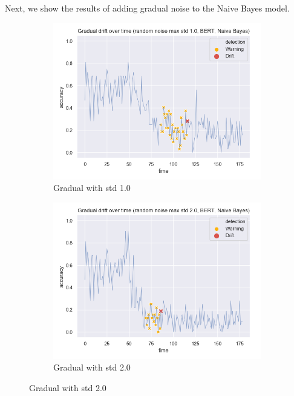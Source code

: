 \documentclass[12pt]{report}
\begin{document}
Next, we show the results of adding gradual noise to the Naive Bayes model.

\begin{figure}[H]
\centering
\begin{subfigure}{.5\textwidth}
  \centering
  \includegraphics[width=\linewidth]{assets/detecting-change/gradual_noise_random_std_1_nb_wos_1_BERT.png}
  \caption{Gradual with std 1.0}
  \label{fig:nb-gradual-std-1}
\end{subfigure}%
\begin{subfigure}{.5\textwidth}
  \centering
  \includegraphics[width=\linewidth]{assets/detecting-change/gradual_noise_random_std_2_nb_wos_1_BERT.png}
  \caption{Gradual with std 2.0}
  \label{fig:nb-gradual-std-2}

\end{subfigure}
\end{figure}
\end{document}
